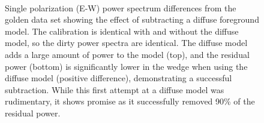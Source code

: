 \documentclass[iop]{emulateapj}
\begin{document}
\begin{figure}
\begin{center}
~
\caption{
Single polarization (E-W) power spectrum differences from the golden data set showing the 
effect of subtracting a diffuse foreground model. The calibration is identical with and without 
the diffuse model, so the dirty power spectra are identical. The diffuse model adds a large 
amount of power to the model (top), and the residual power (bottom) is significantly lower in 
the wedge when using the diffuse model (positive difference), demonstrating a successful 
subtraction. While this first attempt at a diffuse model was rudimentary, it shows promise as 
it successfully removed 90\% of the residual power. 
\label{fig:diffuse_diff}
}
\end{center}
\end{figure}
\end{document}
